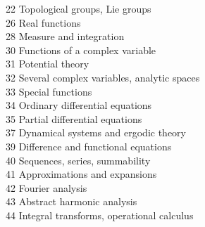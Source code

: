 \documentclass[12pt]{amsart}
\begin{document}
\begin{center}
\begin{tiny}
{{\parbox{8cm}{
22 Topological groups, Lie groups  \\
26 Real functions  \\
28 Measure and integration  \\
30 Functions of a complex variable  \\
31 Potential theory  \\
32 Several complex variables, analytic spaces  \\
33 Special functions  \\
34 Ordinary differential equations \\
35 Partial differential equations \\
37 Dynamical systems and ergodic theory  \\
39 Difference and functional equations \\
40 Sequences, series, summability \\
41 Approximations and expansions  \\
42 Fourier analysis \\
43 Abstract harmonic analysis  \\
44 Integral transforms, operational calculus \\
}
}
\hspace{5mm}
}
\end{tiny}
\end{center}
\end{document}
